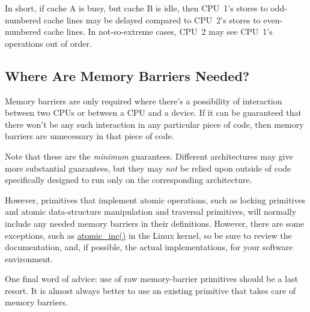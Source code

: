 In short, if cache A is busy, but cache B is idle, then CPU~1's
stores to odd-numbered cache lines may be delayed compared to
CPU~2's stores to even-numbered cache lines.
In not-so-extreme cases, CPU~2 may see CPU~1's operations out
of order.

	 {}

\subsection{Where Are Memory Barriers Needed?}
\label{sec:advsync:Where Are Memory Barriers Needed?}

Memory barriers are only required where there's a possibility of interaction
between two CPUs or between a CPU and a device.  If it can be guaranteed that
there won't be any such interaction in any particular piece of code, then
memory barriers are unnecessary in that piece of code.

Note that these are the \emph{minimum} guarantees.
Different architectures may give
more substantial guarantees,
but they may \emph{not}
be relied upon outside of code specifically designed to run only on
the corresponding architecture.

However, primitives that implement atomic operations, such as locking
primitives and atomic data-structure manipulation and traversal primitives,
will normally include any needed memory barriers in their definitions.
However, there are some exceptions, such as \url{atomic_inc()} in the
Linux kernel, so be sure to review the documentation, and, if possible,
the actual implementations, for your software environment.

One final word of advice: use of raw memory-barrier primitives should
be a last resort.
It is almost always better to use an existing primitive that takes
care of memory barriers.
